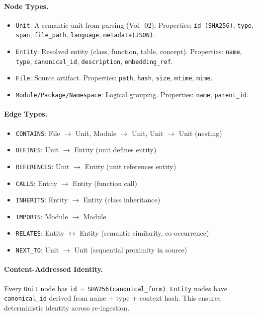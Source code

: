 \paragraph{Node Types.}
\begin{itemize}
  \item \texttt{Unit}: A semantic unit from parsing (Vol.~02). Properties: \texttt{id (SHA256)}, \texttt{type}, \texttt{span}, \texttt{file\_path}, \texttt{language}, \texttt{metadata(JSON)}.
  \item \texttt{Entity}: Resolved entity (class, function, table, concept). Properties: \texttt{name}, \texttt{type}, \texttt{canonical\_id}, \texttt{description}, \texttt{embedding\_ref}.
  \item \texttt{File}: Source artifact. Properties: \texttt{path}, \texttt{hash}, \texttt{size}, \texttt{mtime}, \texttt{mime}.
  \item \texttt{Module/Package/Namespace}: Logical grouping. Properties: \texttt{name}, \texttt{parent\_id}.
\end{itemize}

\paragraph{Edge Types.}
\begin{itemize}
  \item \texttt{CONTAINS}: File $\to$ Unit, Module $\to$ Unit, Unit $\to$ Unit (nesting)
  \item \texttt{DEFINES}: Unit $\to$ Entity (unit defines entity)
  \item \texttt{REFERENCES}: Unit $\to$ Entity (unit references entity)
  \item \texttt{CALLS}: Entity $\to$ Entity (function call)
  \item \texttt{INHERITS}: Entity $\to$ Entity (class inheritance)
  \item \texttt{IMPORTS}: Module $\to$ Module
  \item \texttt{RELATES}: Entity $\leftrightarrow$ Entity (semantic similarity, co-occurrence)
  \item \texttt{NEXT\_TO}: Unit $\to$ Unit (sequential proximity in source)
\end{itemize}

\paragraph{Content-Addressed Identity.}
Every \texttt{Unit} node has \texttt{id = SHA256(canonical\_form)}. \texttt{Entity} nodes have \texttt{canonical\_id} derived from name + type + context hash. This ensures deterministic identity across re-ingestion.

